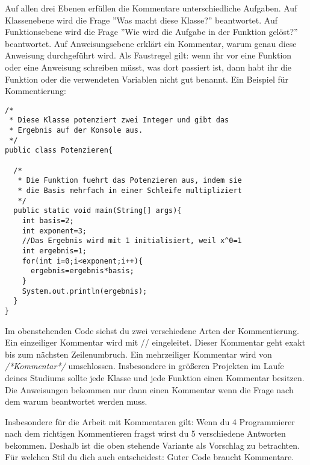 Auf allen drei Ebenen erfüllen die Kommentare unterschiedliche Aufgaben. Auf Klassenebene wird die Frage ''Was macht diese Klasse?'' beantwortet. Auf Funktionsebene wird die Frage ''Wie wird die Aufgabe in der Funktion gelöst?'' beantwortet. Auf Anweisungsebene erklärt ein Kommentar, warum genau diese Anweisung durchgeführt wird. Als Faustregel gilt: wenn ihr vor eine Funktion oder eine Anweisung schreiben müsst, was dort passiert ist, dann habt ihr die Funktion oder die verwendeten Variablen nicht gut benannt. Ein Beispiel für Kommentierung:

\begin{minipage}{\textwidth}
\begin{lstlisting}
/*
 * Diese Klasse potenziert zwei Integer und gibt das 
 * Ergebnis auf der Konsole aus.
 */
public class Potenzieren{

  /*
   * Die Funktion fuehrt das Potenzieren aus, indem sie 
   * die Basis mehrfach in einer Schleife multipliziert
   */
  public static void main(String[] args){
    int basis=2;
    int exponent=3;
    //Das Ergebnis wird mit 1 initialisiert, weil x^0=1
    int ergebnis=1;
    for(int i=0;i<exponent;i++){
      ergebnis=ergebnis*basis;
    }
    System.out.println(ergebnis);
  }
}
\end{lstlisting}
\end{minipage}

Im obenstehenden Code siehst du zwei verschiedene Arten der Kommentierung. Ein einzeiliger Kommentar wird mit // eingeleitet. Dieser Kommentar geht exakt bis zum nächsten Zeilenumbruch. Ein mehrzeiliger Kommentar wird von \textit{/*Kommentar*/} umschlossen. Insbesondere in größeren Projekten im Laufe deines Studiums sollte jede Klasse und jede Funktion einen Kommentar besitzen. Die Anweisungen bekommen nur dann einen Kommentar wenn die Frage nach dem warum beantwortet werden muss.

Insbesondere für die Arbeit mit Kommentaren gilt: Wenn du 4 Programmierer nach dem richtigen Kommentieren fragst wirst du 5 verschiedene Antworten bekommen. Deshalb ist die oben stehende Variante als Vorschlag zu betrachten. Für welchen Stil du dich auch entscheidest: Guter Code braucht Kommentare.